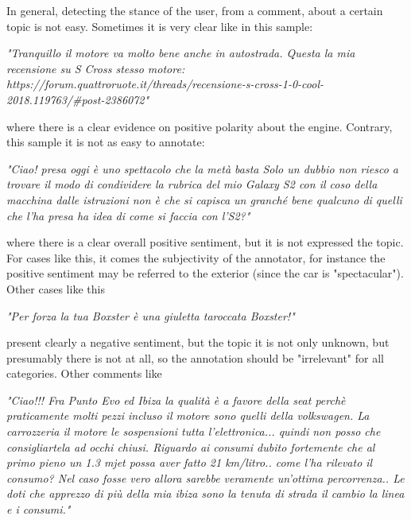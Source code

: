 In general, detecting the stance of the user, from a comment, about a certain topic is not easy. Sometimes it is very clear like in this sample:

\begin{description}
	\item \textit{"Tranquillo il motore va molto bene anche in autostrada. Questa la mia recensione su S Cross stesso motore: https://forum.quattroruote.it/threads/recensione-s-cross-1-0-cool-2018.119763/\#post-2386072"}
\end{description}
where there is a clear evidence on positive polarity about the engine. Contrary, this sample it is not as easy to annotate:

\begin{description}
	\item \textit{"Ciao! presa oggi è uno spettacolo che la metà basta Solo un dubbio non riesco a trovare il modo di condividere la rubrica del mio Galaxy S2 con il coso della macchina dalle istruzioni non è che si capisca un granché bene qualcuno di quelli che l'ha presa ha idea di come si faccia con l'S2?"}
\end{description}
where there is a clear overall positive sentiment, but it is not expressed the topic. For cases like this, it comes the subjectivity of the annotator, for instance the positive sentiment may be referred to the exterior (since the car is "spectacular").
Other cases like this

\begin{description}
	\item \textit{"Per forza la tua Boxster è una giuletta taroccata Boxster!"}
\end{description}

present clearly a negative sentiment, but the topic it is not only unknown, but presumably there is not at all, so the annotation should be "irrelevant" for all categories. Other comments like

\begin{description}
	\item \textit{"Ciao!!! Fra Punto Evo ed Ibiza la qualità è a favore della seat perchè praticamente molti pezzi incluso il motore sono quelli della volkswagen. La carrozzeria il motore le sospensioni tutta l'elettronica... quindi non posso che consigliartela ad occhi chiusi. Riguardo ai consumi dubito fortemente che al primo pieno un 1.3 mjet possa aver fatto 21 km/litro.. come l'ha rilevato il consumo? Nel caso fosse vero allora sarebbe veramente un'ottima percorrenza.. Le doti che apprezzo di più della mia ibiza sono la tenuta di strada il cambio la linea e i consumi."}
\end{description}

